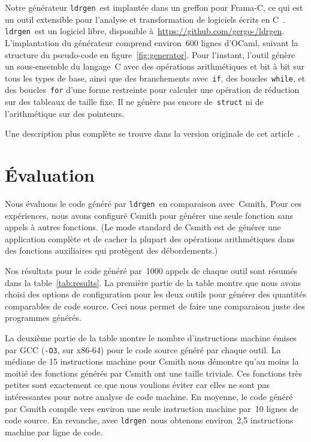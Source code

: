 \documentclass[a4paper]{easychair}
\newcommand\ldrgen{\texttt{ldrgen}}
\begin{document}
Notre générateur \ldrgen\ est implantée dans un greffon pour Frama-C, ce qui
est un outil extensible pour l'analyse et transformation de logiciels écrits
en C~\cite{frama-c}. \ldrgen\ est un logiciel libre, disponible
à~\url{https://github.com/gergo-/ldrgen}. L'implantation du générateur
comprend environ~600 lignes d'OCaml, suivant la structure du pseudo-code en
figure~\ref{fig:generator}. Pour l'instant, l'outil génère un sous-ensemble
du langage~C avec des opérations arithmétiques et bit à bit sur tous les
types de base, ainsi que des branchements avec~\texttt{if}, des
boucles~\texttt{while}, et des boucles~\texttt{for} d'une forme restreinte
pour calculer une opération de réduction sur des tableaux de taille fixe. Il
ne génère pas encore de~\texttt{struct} ni de l'arithmétique sur des
pointeurs.


Une description plus complète se trouve dans la version originale de cet
article~\cite{ldrgen-2017}.


\section{Évaluation}

Nous évaluons le code généré par \ldrgen\ en comparaison avec~Csmith. Pour
ces expériences, nous avons configuré Csmith pour générer une seule
fonction sans appels à autres fonctions. (Le mode standard de Csmith est de
générer une application complète et de cacher la plupart des opérations
arithmétiques dans des fonctions auxiliaires qui protègent des
débordements.)

Nos résultats pour le code généré par~1000 appels de chaque outil sont
résumés dans la table~\ref{tab:results}. La première partie de la table
montre que nous avons choisi des options de configuration pour les deux
outils pour générer des quantités comparables de code source. Ceci nous
permet de faire une comparaison juste des programmes générés.

La deuxième partie de la table montre le nombre d'instructions machine
émises par GCC (\texttt{-O3}, sur x86-64) pour le code source généré par
chaque outil. La médiane de 15 instructions machine pour Csmith nous
démontre qu'au moins la moitié des fonctions générés par Csmith ont une
taille triviale. Ces fonctions très petites sont exactement ce que nous
voulions éviter car elles ne sont pas intéressantes pour notre analyse de
code machine. En moyenne, le code généré par Csmith compile vers environ une
seule instruction machine par~10 lignes de code source. En revanche, avec
\ldrgen\ nous obtenons environ~2,5 instructions machine par ligne de code.
\end{document}
